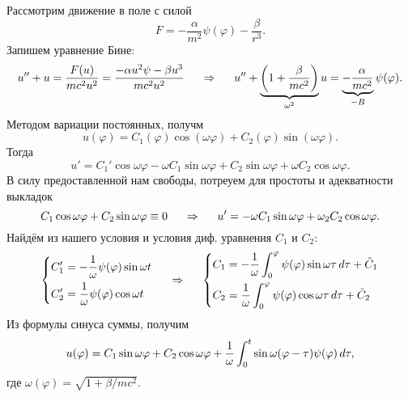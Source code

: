 Рассмотрим движение в поле с силой
\begin{equation}
    F = - \frac{\alpha}{m^2} \psi (\varphi) - \frac{\beta}{r^3} .
\end{equation}
Запишем уравнение Бине:
\begin{equation}
    u'' + u=
    \frac{F(u)}{mc^2u^2} = \frac{-\alpha u^2 \psi - \beta u^3}{mc^2 u^2} 
    \hspace{0.5cm} \Rightarrow \hspace{0.5cm} 
    u'' + 
    \underbrace{\left(1 + \frac{\beta}{mc^2} \right)}_{\omega^2}
    u = 
    \underbrace{-\frac{\alpha}{mc^2}  }_{-B}
    \psi(\varphi).
\end{equation}
Методом вариации постоянных, получм
\begin{equation}
    u(\varphi) = C_1 (\varphi) \cos (\omega \varphi) + C_2 (\varphi) \sin (\omega \varphi).
\end{equation}
Тогда
\begin{equation}
    u' = C_1' \cos \omega \varphi - \omega C_1 \sin \omega \varphi + C_2 \sin \omega \varphi + \omega C_2 \cos \omega \varphi.
\end{equation}
В силу предоставленной нам свободы, потреуем для простоты и адекватности выкладок
\begin{equation}
    C_1 \cos \omega \varphi + C_2 \sin \omega \varphi \equiv 0
    \hspace{0.5cm} \Rightarrow \hspace{0.5cm} 
    u' = - \omega C_1 \sin \omega \varphi + \omega_2 C_2 \cos \omega \varphi.
\end{equation}
Найдём из нашего условия и условия диф. уравнения $C_1$ и $C_2$:
\begin{equation}
    \left\{\begin{aligned}
        C_1' &= - \frac{1}{\omega} \psi(\varphi) \sin \omega t \\
        C_2' &=  \frac{1}{\omega} \psi (\varphi) \cos \omega t
    \end{aligned}\right.
    \hspace{0.5cm} \Rightarrow \hspace{0.5cm} 
    \left\{\begin{aligned}
        C_1 &= - \frac{1}{\omega} \int_0^\varphi \psi(\varphi) \sin \omega \tau \, d \tau + \tilde C_1 \\
        C_2 &=  \frac{1}{\omega} \int_0^\varphi \psi(\varphi) \cos \omega \tau \, d \tau + \tilde C_2
    \end{aligned}\right.
\end{equation}
Из  формулы синуса суммы, получим
\begin{equation}
    u(\varphi) = C_1 \sin \omega \varphi + C_2 \cos \omega \varphi +
    \frac{1}{\omega} \int_0^t \sin \omega(\varphi-\tau) \psi(\varphi) \, d \tau,
\end{equation}
где $\omega(\varphi) = \sqrt{1 + \beta/mc^2}$.


